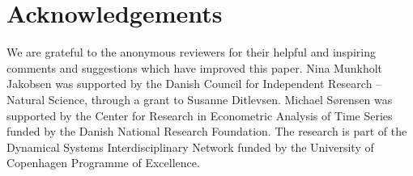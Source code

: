 \documentclass[11pt,a4paper]{article}
\numberwithin{equation}{section}
\numberwithin{theorem}{section}
\begin{document}
\section*{Acknowledgements}
We are grateful to the anonymous reviewers for their helpful and inspiring comments and suggestions which have improved this paper. Nina Munkholt Jakobsen was supported by the Danish Council for Independent Research -- Natural Science, through a grant to Susanne Ditlevsen. Michael S\o rensen was supported by the Center for Research in Econometric Analysis of Time Series funded by the Danish National Research Foundation. The research is part of the Dynamical Systems Interdisciplinary Network funded by the University of Copenhagen Programme of Excellence.
%

 
%
\end{document}
